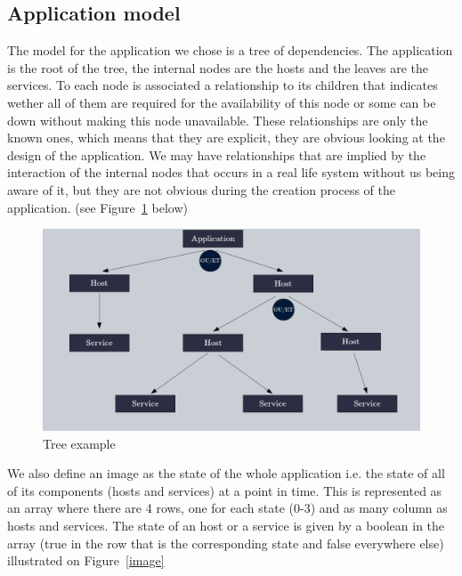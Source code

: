 \documentclass[10pt,a4paper,oneside]{article}
\begin{document}
\begin{multicols}{2}
\subsection{Application model}
The model for the application we chose is a tree of dependencies. The application is the root of the tree, the internal nodes are the hosts and the leaves are the services. To each node is associated a relationship to its children that indicates wether all of them are required for the availability of this node or some can be down without making this node unavailable. These relationships are only the known ones, which means that they are explicit, they are obvious looking at the design of the application. We may have relationships that are implied by the interaction of the internal nodes that occurs in a real life system without us being aware of it, but they are not obvious during the creation process of the application. (see Figure~\ref{exampletree} below)
\end{multicols}

\vspace{0.8cm}

\begin{figure}[!h]
\centering
\includegraphics[scale=0.35]{./images/arbrerelations.png}
\caption{Tree example}
\label{exampletree}
\end{figure}

\vspace{0.8cm}

\begin{multicols}{2}
We also define an image as the state of the whole application i.e. the state of all of its components (hosts and services) at a point in time. This is represented as an array where there are 4 rows, one for each state (0-3) and as many column as hosts and services. The state of an host or a service is given by a boolean in the array (true in the row that is the corresponding state and false everywhere else) illustrated on Figure~\ref{image}

\end{multicols}
\end{document}
